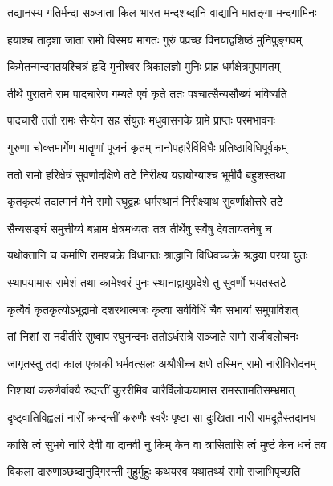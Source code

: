 \twolineshloka
{तद्यानस्य गतिर्मन्दा सञ्जाता किल भारत}
{मन्दशब्दानि वाद्यानि मातङ्गा मन्दगामिनः}%

\twolineshloka
{हयाश्च तादृशा जाता रामो विस्मय मागतः}
{गुरुं पप्रच्छ विनयाद्वशिष्ठं मुनिपुङ्गवम्}%

\twolineshloka
{किमेतन्मन्दगतयश्चित्रं हृदि मुनीश्वर}
{त्रिकालज्ञो मुनिः प्राह धर्मक्षेत्रमुपागतम्}%

\twolineshloka
{तीर्थे पुरातने राम पादचारेण गम्यते}
{एवं कृते ततः पश्चात्सैन्यसौख्यं भविष्यति}%

\twolineshloka
{पादचारी ततौ रामः सैन्येन सह संयुतः}
{मधुवासनके ग्रामे प्राप्तः परमभावनः}%

\twolineshloka
{गुरुणा चोक्तमार्गेण मातॄणां पूजनं कृतम्}
{नानोपहारैर्विविधैः प्रतिष्ठाविधिपूर्वकम्}%

\twolineshloka
{ततो रामो हरिक्षेत्रं सुवर्णादक्षिणे तटे}
{निरीक्ष्य यज्ञयोग्याश्च भूमीर्वै बहुशस्तथा}%

\twolineshloka
{कृतकृत्यं तदात्मानं मेने रामो रघूद्वहः}
{धर्मस्थानं निरीक्ष्याथ सुवर्णाक्षोत्तरे तटे}%

\twolineshloka
{सैन्यसङ्घं समुत्तीर्य्य बभ्राम क्षेत्रमध्यतः}
{तत्र तीर्थेषु सर्वेषु देवतायतनेषु च}%

\twolineshloka
{यथोक्तानि च कर्माणि रामश्चक्रे विधानतः}
{श्राद्धानि विधिवच्चक्रे श्रद्धया परया युतः}%

\twolineshloka
{स्थापयामास रामेशं तथा कामेश्वरं पुनः}
{स्थानाद्वायुप्रदेशे तु सुवर्णो भयतस्तटे}%

\twolineshloka
{कृत्वैवं कृतकृत्योऽभूद्रामो दशरथात्मजः}
{कृत्वा सर्वविधिं चैव सभायां समुपाविशत्}%

\twolineshloka
{तां निशां स नदीतीरे सुष्वाप रघुनन्दनः}
{ततोऽर्धरात्रे सञ्जाते रामो राजीवलोचनः}%

\twolineshloka
{जागृतस्तु तदा काल एकाकी धर्मवत्सलः}
{अश्रौषीच्च क्षणे तस्मिन् रामो नारीविरोदनम्}%

\twolineshloka
{निशायां करुणैर्वाक्यै रुदन्तीं कुररीमिव}
{चारैर्विलोकयामास रामस्तामतिसम्भ्रमात्}%

\twolineshloka
{दृष्ट्वातिविह्वलां नारीं क्रन्दन्तीं करुणैः स्वरैः}
{पृष्टा सा दुःखिता नारी रामदूतैस्तदानघ}%


\twolineshloka
{कासि त्वं सुभगे नारि देवी वा दानवी नु किम्}
{केन वा त्रासितासि त्वं मुष्टं केन धनं तव}%

\twolineshloka
{विकला दारुणाञ्छब्दानुद्गिरन्ती मुहुर्मुहुः}
{कथयस्व यथातथ्यं रामो राजाभिपृच्छति}%

